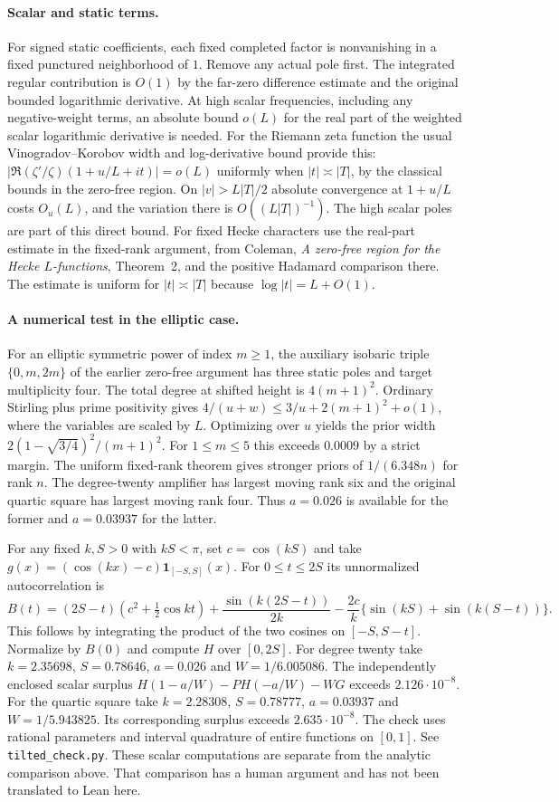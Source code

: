 \paragraph{Scalar and static terms.}
For signed static coefficients, each fixed completed factor is
nonvanishing in a fixed punctured neighborhood of $1$. Remove any
actual pole first. The integrated regular contribution is $O(1)$ by
the far-zero difference estimate and the original bounded logarithmic
derivative. At high scalar frequencies, including any negative-weight
terms, an absolute bound $o(L)$ for the real part of the weighted scalar logarithmic
derivative is needed. For the Riemann zeta function the usual
Vinogradov--Korobov width and log-derivative bound provide this:
$|\Re(\zeta'/\zeta)(1+u/L+it)|=o(L)$ uniformly when
$|t|\asymp |T|$, by the classical bounds in the zero-free region.
On $|v|>L|T|/2$ absolute convergence at $1+u/L$ costs $O_u(L)$,
and the variation there is $O((L|T|)^{-1})$. The high scalar poles
are part of this direct bound. For fixed Hecke characters use the real-part estimate in the
fixed-rank argument, from Coleman, \emph{A zero-free region for the
Hecke $L$-functions}, Theorem~2, and the positive Hadamard comparison
there. The estimate is uniform for $|t|\asymp|T|$ because $\log|t|=L+O(1)$.

\paragraph{A numerical test in the elliptic case.}
For an elliptic symmetric power of index $m\ge1$, the auxiliary
isobaric triple $\{0,m,2m\}$ of the earlier zero-free argument has
three static poles and target multiplicity four. The total degree at
shifted height is $4(m+1)^2$. Ordinary Stirling plus prime positivity
gives $4/(u+w)\le3/u+2(m+1)^2+o(1)$, where the variables are scaled by
$L$. Optimizing over $u$ yields the prior width
$2(1-\sqrt{3/4})^2/(m+1)^2$. For $1\le m\le5$ this exceeds
$0.0009$ by a strict margin. The uniform fixed-rank theorem gives
stronger priors of $1/(6.348n)$ for rank $n$.
The degree-twenty amplifier has largest moving rank six and the
original quartic square has largest moving rank four. Thus $a=0.026$
is available for the former and $a=0.03937$ for the latter.

For any fixed $k,S>0$ with $kS<\pi$, set $c=\cos(kS)$ and take
$g(x)=(\cos(kx)-c)\mathbf1_{[-S,S]}(x)$. For $0\le t\le2S$ its
unnormalized autocorrelation is
\[
 B(t)=(2S-t)\left(c^2+\tfrac12\cos kt\right)
       +\frac{\sin(k(2S-t))}{2k}
       -\frac{2c}{k}\{\sin(kS)+\sin(k(S-t))\}.
\]
This follows by integrating the product of the two cosines on
$[-S,S-t]$. Normalize by $B(0)$ and compute $H$ over $[0,2S]$.
For degree twenty take $k=2.35698$, $S=0.78646$, $a=0.026$ and
$W=1/6.005086$. The independently enclosed scalar surplus
$H(1-a/W)-PH(-a/W)-WG$ exceeds $2.126\cdot10^{-8}$.
For the quartic square take $k=2.28308$, $S=0.78777$, $a=0.03937$
and $W=1/5.943825$. Its corresponding surplus exceeds
$2.635\cdot10^{-8}$. The check uses rational parameters and interval
quadrature of entire functions on $[0,1]$.
See \texttt{tilted\_check.py}. These scalar computations are separate
from the analytic comparison above. That comparison has a human
argument and has not been translated to Lean here.
